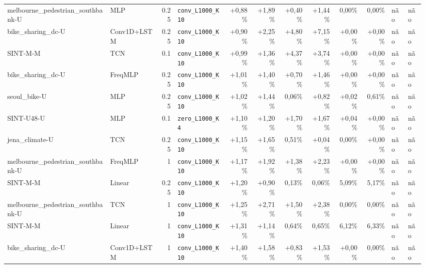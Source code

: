 \begin{longtable}{llrlrrrrrrll}
melbourne\_pedestrian\_southbank-U & MLP & 0.25 & \texttt{conv\_\allowbreak{}L1000\_\allowbreak{}K10} & +0,88\% & +1,89\% & +0,40\% & +1,44\% & \textminus{}0,00\% & \textminus{}0,00\% & n\~ao & n\~ao \\
bike\_sharing\_dc-U & Conv1D+LSTM & 0.25 & \texttt{conv\_\allowbreak{}L1000\_\allowbreak{}K10} & +0,90\% & +2,25\% & +4,80\% & +7,15\% & +0,00\% & +0,00\% & n\~ao & n\~ao \\
SINT-M-M & TCN & 0.1 & \texttt{conv\_\allowbreak{}L1000\_\allowbreak{}K10} & +0,99\% & +1,36\% & +4,37\% & +3,74\% & +0,00\% & +0,00\% & n\~ao & n\~ao \\
bike\_sharing\_dc-U & FreqMLP & 0.25 & \texttt{conv\_\allowbreak{}L1000\_\allowbreak{}K10} & +1,01\% & +1,40\% & +0,70\% & +1,46\% & +0,00\% & +0,00\% & n\~ao & n\~ao \\
seoul\_bike-U & MLP & 0.25 & \texttt{conv\_\allowbreak{}L1000\_\allowbreak{}K10} & +1,02\% & +1,44\% & \textminus{}0,06\% & +0,82\% & +0,02\% & \textminus{}0,61\% & n\~ao & n\~ao \\
SINT-U48-U & MLP & 0.1 & \texttt{zero\_\allowbreak{}L1000\_\allowbreak{}K4} & +1,10\% & +1,20\% & +1,70\% & +1,67\% & +0,04\% & +0,00\% & n\~ao & n\~ao \\
jena\_climate-U & TCN & 0.25 & \texttt{conv\_\allowbreak{}L1000\_\allowbreak{}K10} & +1,15\% & +1,65\% & \textminus{}0,51\% & +0,04\% & \textminus{}0,00\% & +0,00\% & n\~ao & n\~ao \\
melbourne\_pedestrian\_southbank-U & FreqMLP & 1 & \texttt{conv\_\allowbreak{}L1000\_\allowbreak{}K10} & +1,17\% & +1,92\% & +1,38\% & +2,23\% & +0,00\% & +0,00\% & n\~ao & n\~ao \\
SINT-M-M & Linear & 0.25 & \texttt{conv\_\allowbreak{}L1000\_\allowbreak{}K10} & +1,20\% & +0,90\% & \textminus{}0,13\% & \textminus{}0,06\% & \textminus{}5,09\% & \textminus{}5,17\% & n\~ao & n\~ao \\
melbourne\_pedestrian\_southbank-U & TCN & 1 & \texttt{conv\_\allowbreak{}L1000\_\allowbreak{}K10} & +1,25\% & +2,71\% & +1,50\% & +2,38\% & \textminus{}0,00\% & \textminus{}0,00\% & n\~ao & n\~ao \\
SINT-M-M & Linear & 1 & \texttt{conv\_\allowbreak{}L1000\_\allowbreak{}K10} & +1,31\% & +1,14\% & \textminus{}0,64\% & \textminus{}0,65\% & \textminus{}6,12\% & \textminus{}6,33\% & n\~ao & n\~ao \\
bike\_sharing\_dc-U & Conv1D+LSTM & 1 & \texttt{conv\_\allowbreak{}L1000\_\allowbreak{}K10} & +1,40\% & +1,58\% & +0,83\% & +1,53\% & +0,00\% & \textminus{}0,00\% & n\~ao & n\~ao \\

\end{longtable}
